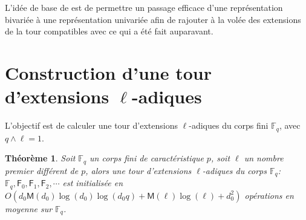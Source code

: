 \documentclass[10pt,a4paper]{book}
\theoremstyle{plain}
\newtheorem{thm}{Théorème}
\theoremstyle{definition}
\theoremstyle{definition}
\theoremstyle{definition}
\theoremstyle{definition}
\theoremstyle{remark}
\theoremstyle{remark}
\begin{document}
L'idée de base de \cite{Doliskani-Schost15} est de permettre un passage efficace d'une représentation bivariée à une représentation univariée afin de rajouter à la volée des extensions de la tour compatibles avec ce qui a été fait auparavant.

\section{Construction d'une tour d'extensions $\ell$-adiques}
L'objectif est de calculer une tour d'extensions $\ell$-adiques du corps fini $\mathbb{F}_q$, avec $q \wedge \ell =1$. 

\begin{thm}
Soit $\mathbb{F}_q$ un corps fini de caractéristique $p$, soit $\ell$ un nombre premier différent de $p$,  alors une tour d'extensions $\ell$-adiques du corps $\mathbb{F}_q$: $\mathbb{F}_q, \mathsf{F}_0, \mathsf{F}_1, \mathsf{F}_2, \cdots$ est initialisée en $O(d_0\mathsf{M}(d_0)\log(d_0)\log(d_0q)+\mathsf{M}(\ell)\log(\ell)+d_0^2)$ opérations en moyenne sur $\mathbb{F}_q$.
\end{thm}
 
\end{document}
